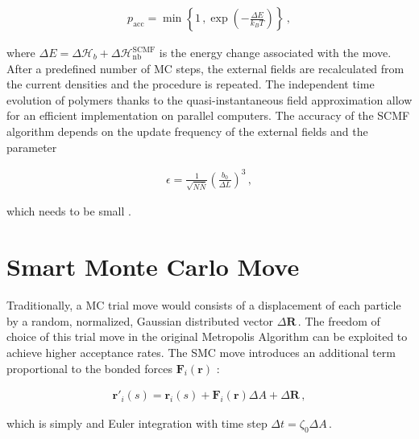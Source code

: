 \documentclass[bachelor,       %
               twoside,        %
               BCOR10mm,       %
               ngerman, english %
               ]{GAUBM}
\begin{document}
\begin{align}
    p_{\text{acc}}=\min\left\{1\,,\exp\left(-\frac{\Delta E}{k_BT}\right)\right\}\,,
    \label{eq:metropolis_mc}
\end{align}

where $\Delta E=\Delta\mathcal H_b+\Delta\mathcal H_{\text{nb}}^{\text{SCMF}}$ is the energy change associated with the move. After a predefined number of \ac{MC} steps, the external fields are recalculated from the current densities and the procedure is repeated. The independent time evolution of polymers thanks to the quasi-instantaneous field approximation allow for an efficient implementation on parallel computers. The accuracy of the \ac{SCMF} algorithm depends on the update frequency of the external fields and the parameter

\begin{align}
    \epsilon=\frac{1}{\sqrt{N\bar N}}\left(\frac{b_0}{\Delta L}\right)^3\,,
\end{align}

which needs to be small \cite{Schneider_soma}.

\section{Smart Monte Carlo Move}

Traditionally, a \ac{MC} trial move would consists of a displacement of each particle by a random, normalized, Gaussian distributed vector $\Delta\mathbf R\,.$ The freedom of choice of this trial move in the original Metropolis Algorithm \cite{metropolis} can be exploited to achieve higher acceptance rates. The \ac{SMC} move introduces an additional term proportional to the bonded forces $\mathbf{F}_i(\mathbf r)$ \cite{smc, mueller_deltat}:

\begin{align}
    \mathbf{r'}_i(s)=\mathbf{r}_i(s)+\mathbf{F}_i(\mathbf r)\Delta A+\Delta\mathbf R\,,
\end{align}

which is simply and Euler integration with time step $\Delta t=\zeta_0\Delta A\,.$



\end{document}

